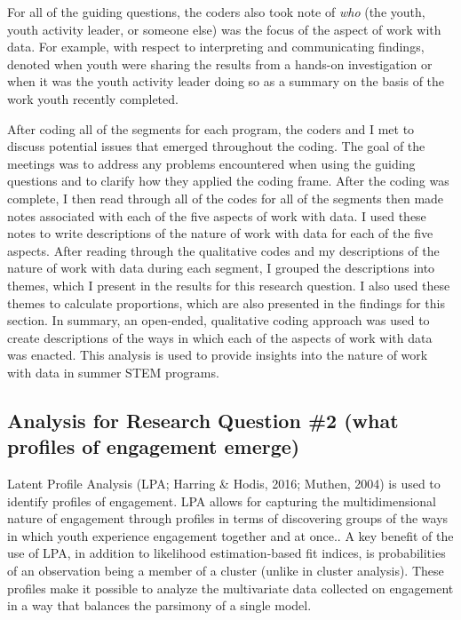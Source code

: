 \documentclass[]{msu-thesis}
\theoremstyle{definition}
\theoremstyle{definition}
\theoremstyle{definition}
\theoremstyle{remark}
\begin{document}
For all of the guiding questions, the coders also took note of
\emph{who} (the youth, youth activity leader, or someone else) was the
focus of the aspect of work with data. For example, with respect to
interpreting and communicating findings, denoted when youth were sharing
the results from a hands-on investigation or when it was the youth
activity leader doing so as a summary on the basis of the work youth
recently completed.

After coding all of the segments for each program, the coders and I met
to discuss potential issues that emerged throughout the coding. The goal
of the meetings was to address any problems encountered when using the
guiding questions and to clarify how they applied the coding frame.
After the coding was complete, I then read through all of the codes for
all of the segments then made notes associated with each of the five
aspects of work with data. I used these notes to write descriptions of
the nature of work with data for each of the five aspects. After reading
through the qualitative codes and my descriptions of the nature of work
with data during each segment, I grouped the descriptions into themes,
which I present in the results for this research question. I also used
these themes to calculate proportions, which are also presented in the
findings for this section. In summary, an open-ended, qualitative coding
approach was used to create descriptions of the ways in which each of
the aspects of work with data was enacted. This analysis is used to
provide insights into the nature of work with data in summer STEM
programs.

\subsection{Analysis for Research Question \#2 (what profiles of
engagement
emerge)}\label{analysis-for-research-question-2-what-profiles-of-engagement-emerge}

Latent Profile Analysis (LPA; Harring \& Hodis, 2016; Muthen, 2004) is
used to identify profiles of engagement. LPA allows for capturing the
multidimensional nature of engagement through profiles in terms of
discovering groups of the ways in which youth experience engagement
together and at once.. A key benefit of the use of LPA, in addition to
likelihood estimation-based fit indices, is probabilities of an
observation being a member of a cluster (unlike in cluster analysis).
These profiles make it possible to analyze the multivariate data
collected on engagement in a way that balances the parsimony of a single
model.
\end{document}
